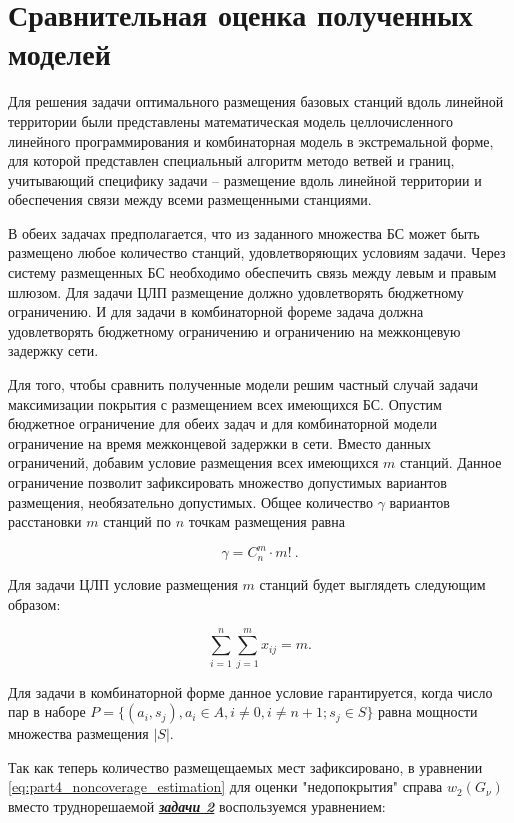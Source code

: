\section{Сравнительная оценка полученных моделей}
Для решения задачи оптимального размещения базовых станций вдоль линейной территории были представлены математическая модель целлочисленного линейного программирования и комбинаторная модель в экстремальной форме, для которой представлен специальный алгоритм методо ветвей и границ, учитывающий специфику задачи -- размещение вдоль линейной территории и обеспечения связи между всеми размещенными станциями.

В обеих задачах предполагается, что из заданного множества БС может быть размещено любое количество станций, удовлетворяющих условиям задачи. Через систему размещенных БС необходимо обеспечить связь между левым и правым шлюзом. Для задачи ЦЛП размещение должно удовлетворять бюджетному ограничению. И для задачи в комбинаторной фореме задача должна удовлетворять бюджетному ограничению и ограничению на межконцевую задержку сети.

Для того, чтобы сравнить полученные модели решим частный случай задачи максимизации покрытия с размещением всех имеющихся БС. Опустим бюджетное ограничение для обеих задач и для комбинаторной модели ограничение на время межконцевой задержки в сети. Вместо данных ограничений, добавим условие размещения всех имеющихся $m$ станций. Данное ограничение позволит зафиксировать множество допустимых вариантов размещения, необязательно допустимых. Общее количество $\gamma$ вариантов расстановки $m$ станций по $n$ точкам размещения равна 

$$
  \gamma = C^m_n \cdot m! \ .
$$

Для задачи ЦЛП условие размещения $m$ станций будет выглядеть следующим образом:


\begin{equation}
  \label{eq:part3_placed_all_station}
  \sum\limits_{i=1}^n \sum\limits_{j=1}^m x_{ij} = m.
\end{equation}

Для задачи в комбинаторной форме данное условие гарантируется, когда число пар в наборе $P = \{ (a_i, s_j), a_i \in A, i \neq 0, i \neq n + 1; s_j \in S\}$ равна мощности множества размещения $|S|$. 

Так как теперь количество размещещаемых мест зафиксировано, в уравнении \cref{eq:part4_noncoverage_estimation} для оценки "недопокрытия" справа $w_2 \left(G_\nu \right)$ вместо труднорешаемой \underline{\textit{\textbf{задачи 2}}} воспользуемся уравнением:

